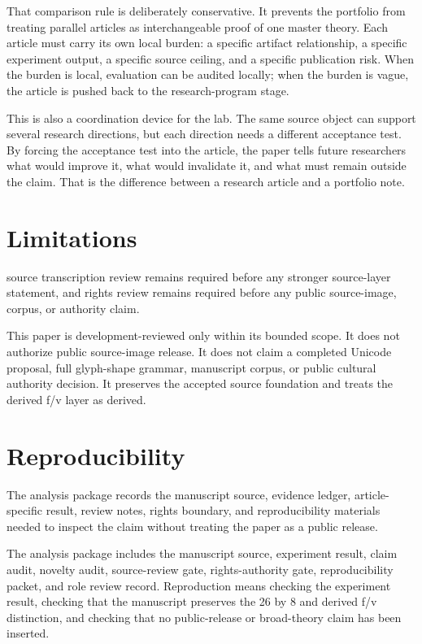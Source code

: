 \documentclass[sigconf,nonacm]{acmart}
\begin{document}
That comparison rule is deliberately conservative. It prevents the portfolio
from treating parallel articles as interchangeable proof of one master theory.
Each article must carry its own local burden: a specific artifact relationship,
a specific experiment output, a specific source ceiling, and a specific
publication risk. When the burden is local, evaluation can be audited locally; when
the burden is vague, the article is pushed back to the research-program stage.

This is also a coordination device for the lab. The same source object can
support several research directions, but each direction needs a different
acceptance test. By forcing the acceptance test into the article, the paper tells
future researchers what would improve it, what would invalidate it, and what
must remain outside the claim. That is the difference between a research article
and a portfolio note.

\section{Limitations}
source transcription review remains required before any stronger source-layer statement, and rights review remains required before any public source-image, corpus, or authority claim. 

This paper is development-reviewed only within its bounded scope. It does not
authorize public source-image release. It does not claim a completed Unicode
proposal, full glyph-shape grammar, manuscript corpus, or public cultural
authority decision. It preserves the accepted source foundation and treats the
derived f/v layer as derived.

\section{Reproducibility}
The analysis package records the manuscript source, evidence ledger, article-specific result, review notes, rights boundary, and reproducibility materials needed to inspect the claim without treating the paper as a public release. 

The analysis package includes the manuscript source, experiment result, claim
audit, novelty audit, source-review gate, rights-authority gate,
reproducibility packet, and role review record. Reproduction means checking the
experiment result, checking that the manuscript preserves the 26 by 8 and
derived f/v distinction, and checking that no public-release or broad-theory
claim has been inserted.
\end{document}
